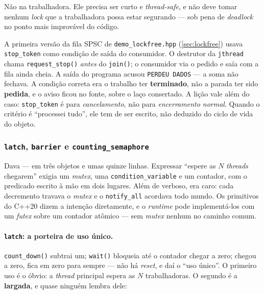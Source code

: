 \begin{armadilha}
Não na trabalhadora. Ele precisa ser curto e \emph{thread-safe}, e não deve
tomar nenhum \emph{lock} que a trabalhadora possa estar segurando --- sob pena
de \emph{deadlock} no ponto mais improvável do código.
\end{armadilha}

\begin{armadilha}
A primeira versão da fila SPSC de \texttt{demo\_lockfree.hpp}
(\cref{sec:lockfree}) usava \texttt{stop\_token} como condição de saída do
consumidor. O destrutor da \texttt{jthread} chama \texttt{request\_stop()}
\emph{antes} do \texttt{join()}; o consumidor via o pedido e saía com a fila
ainda cheia. A saída do programa acusou \texttt{PERDEU DADOS} --- a soma não
fechava. A condição correta era o trabalho ter \textbf{terminado}, não a parada
ter sido \textbf{pedida}, e o aviso ficou no fonte, sobre o laço consertado. A
lição vale além do caso: \texttt{stop\_token} é para \emph{cancelamento}, não
para \emph{encerramento normal}. Quando o critério é ``processei tudo'', ele
tem de ser escrito, não deduzido do ciclo de vida do objeto.
\end{armadilha}

\subsubsection{\texttt{latch}, \texttt{barrier} e \texttt{counting\_semaphore}}

\begin{porque}
Dava --- em três objetos e umas quinze linhas. Expressar ``espere as $N$
\emph{threads} chegarem'' exigia um \emph{mutex}, uma
\texttt{condition\_variable} e um contador, com o predicado escrito à mão em
dois lugares. Além de verboso, era caro: cada decremento travava o \emph{mutex}
e o \texttt{notify\_all} acordava todo mundo. Os primitivos do C++20 dizem a
intenção diretamente, e o \emph{runtime} pode implementá-los com um
\emph{futex} sobre um contador atômico --- sem \emph{mutex} nenhum no caminho
comum.
\end{porque}

\paragraph{\texttt{latch}: a porteira de uso único.}
\texttt{count\_down()} subtrai um; \texttt{wait()} bloqueia até o contador
chegar a zero; chegou a zero, fica em zero para sempre --- não há \emph{reset},
e daí o ``uso único''. O primeiro uso é o óbvio: a \emph{thread} principal
espera as $N$ trabalhadoras. O segundo é a \textbf{largada}, e quase ninguém
lembra dele:

